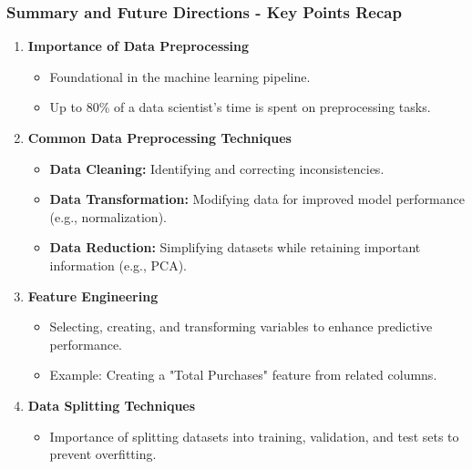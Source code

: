 \documentclass[aspectratio=169]{beamer}
\begin{document}
\begin{frame}[fragile]
    \frametitle{Summary and Future Directions - Key Points Recap}
    \begin{enumerate}
        \item \textbf{Importance of Data Preprocessing}
        \begin{itemize}
            \item Foundational in the machine learning pipeline.
            \item Up to 80\% of a data scientist's time is spent on preprocessing tasks.
        \end{itemize}

        \item \textbf{Common Data Preprocessing Techniques}
        \begin{itemize}
            \item \textbf{Data Cleaning:} Identifying and correcting inconsistencies.
            \item \textbf{Data Transformation:} Modifying data for improved model performance (e.g., normalization).
            \item \textbf{Data Reduction:} Simplifying datasets while retaining important information (e.g., PCA).
        \end{itemize}

        \item \textbf{Feature Engineering}
        \begin{itemize}
            \item Selecting, creating, and transforming variables to enhance predictive performance.
            \item Example: Creating a "Total Purchases" feature from related columns.
        \end{itemize}

        \item \textbf{Data Splitting Techniques}
        \begin{itemize}
            \item Importance of splitting datasets into training, validation, and test sets to prevent overfitting.
        \end{itemize}
    \end{enumerate}
\end{frame}
\end{document}

